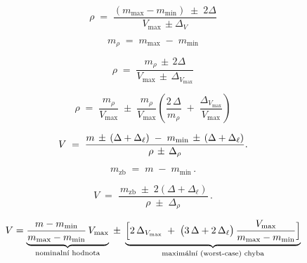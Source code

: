 \[
\rho \;=\;
\frac{(m_{\max}-m_{\min})\;\pm\;2\Delta}
     {V_{\max}\,\pm\Delta_V}
\]

\[
m_{\rho} \;=\; m_{\max} \;-\; m_{\min}
\]

\[
\rho \;=\;
\frac{m_{\rho} \,\pm\, 2\Delta}
     {V_{\max} \,\pm\, \Delta_{V_{\max}}}
\]

\[
\rho \;=\;
\frac{m_{\rho}}{V_{\max}}
\;\pm\;
\frac{m_{\rho}}{V_{\max}}
\left(
   \frac{2\,\Delta}{m_{\rho}} \;+\; \frac{\Delta_{V_{\max}}}{V_{\max}}
\right)
\]

\[
V \;=\;
\frac{%
      m \,\pm\, (\Delta + \Delta_\ell)
      \;-\;
      m_{\min} \,\pm\, (\Delta + \Delta_\ell)
     }{%
      \rho \,\pm\, \Delta_\rho
     }.
\]

\[
m_{\mathrm{zb}} \;=\; m \;-\; m_{\min}\,.
\]

\[
V \;=\;
\frac{\,m_{\mathrm{zb}} \;\pm\; 2(\Delta + \Delta_\ell)}
     {\rho \;\pm\; \Delta_\rho}\,.
\]

\begin{center}    
\end{center}

\begin{center}  
\end{center}  

\[
V
=
\underbrace{\frac{m-m_{\min}}{m_{\max}-m_{\min}}\,V_{\max}}_{\text{nominalní hodnota}}
\;\pm\;
\underbrace{\Bigl[
      2\,\Delta_{V_{\text{max}}}
      \;+\;
      \bigl(3\,\Delta+2\,\Delta_{\ell}\bigr)\,
      \frac{V_{\max}}{m_{\max}-m_{\min}}
\Bigr]}_{\text{maximální (worst-case) chyba}}
\]

